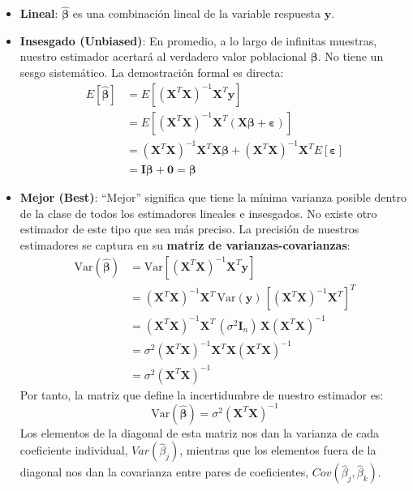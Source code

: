 \documentclass[
  letterpaper,
  DIV=11,
  numbers=noendperiod]{scrreprt}
\providecommand{\tightlist}{%
  \setlength{\itemsep}{0pt}\setlength{\parskip}{0pt}}
\begin{document}
\begin{itemize}
\tightlist
\item
  \textbf{Lineal}: \(\hat{\boldsymbol{\beta}}\) es una combinación
  lineal de la variable respuesta \(\mathbf{y}\).
\item
  \textbf{Insesgado (Unbiased)}: En promedio, a lo largo de infinitas
  muestras, nuestro estimador acertará al verdadero valor poblacional
  \(\boldsymbol{\beta}\). No tiene un sesgo sistemático. La demostración
  formal es directa: \begin{align}
    E[\hat{\boldsymbol{\beta}}] &= E[(\mathbf{X}^T\mathbf{X})^{-1}\mathbf{X}^T\mathbf{y}] \nonumber \\
    &= E[(\mathbf{X}^T\mathbf{X})^{-1}\mathbf{X}^T(\mathbf{X}\boldsymbol{\beta} + \boldsymbol{\varepsilon})] \nonumber \\
    &= (\mathbf{X}^T\mathbf{X})^{-1}\mathbf{X}^T\mathbf{X}\boldsymbol{\beta} + (\mathbf{X}^T\mathbf{X})^{-1}\mathbf{X}^T E[\boldsymbol{\varepsilon}] \nonumber \\
    &= \boldsymbol{I}\boldsymbol{\beta} + \mathbf{0} = \boldsymbol{\beta} \nonumber
    \end{align}
\item
  \textbf{Mejor (Best)}: ``Mejor'' significa que tiene la mínima
  varianza posible dentro de la clase de todos los estimadores lineales
  e insesgados. No existe otro estimador de este tipo que sea más
  preciso. La precisión de nuestros estimadores se captura en su
  \textbf{matriz de varianzas-covarianzas}: \begin{align}
    \text{Var}(\hat{\boldsymbol{\beta}}) &= \text{Var}[(\mathbf{X}^T\mathbf{X})^{-1}\mathbf{X}^T\mathbf{y}] \nonumber \\
    &= (\mathbf{X}^T\mathbf{X})^{-1}\mathbf{X}^T \, \text{Var}(\mathbf{y}) \, [(\mathbf{X}^T\mathbf{X})^{-1}\mathbf{X}^T]^T \nonumber \\
    &= (\mathbf{X}^T\mathbf{X})^{-1}\mathbf{X}^T \, (\sigma^2 \mathbf{I}_n) \, \mathbf{X}(\mathbf{X}^T\mathbf{X})^{-1} \nonumber \\
    &= \sigma^2 (\mathbf{X}^T\mathbf{X})^{-1}\mathbf{X}^T\mathbf{X}(\mathbf{X}^T\mathbf{X})^{-1} \nonumber \\
    &= \sigma^2 (\mathbf{X}^T\mathbf{X})^{-1} \nonumber
    \end{align} Por tanto, la matriz que define la incertidumbre de
  nuestro estimador es:
  \[\text{Var}(\hat{\boldsymbol{\beta}}) = \sigma^2(\mathbf{X}^T\mathbf{X})^{-1}\]
  Los elementos de la diagonal de esta matriz nos dan la varianza de
  cada coeficiente individual, \(Var(\hat{\beta}_j)\), mientras que los
  elementos fuera de la diagonal nos dan la covarianza entre pares de
  coeficientes, \(Cov(\hat{\beta}_j, \hat{\beta}_k)\).
\end{itemize}
\end{document}
